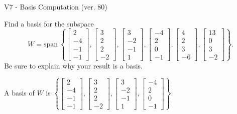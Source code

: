 \begin{exercise}
  \begin{exerciseTitle}V7 - Basis Computation (ver. 80)\end{exerciseTitle}
  \begin{exerciseStatement}
    Find a basis for the subspace 
\[W=\mathrm{span}\ \left\{\left[\begin{array}{r}
2 \\
-4 \\
-1 \\
-1
\end{array}\right] , \left[\begin{array}{r}
3 \\
2 \\
2 \\
-2
\end{array}\right] , \left[\begin{array}{r}
3 \\
-2 \\
-1 \\
1
\end{array}\right] , \left[\begin{array}{r}
-4 \\
2 \\
0 \\
-1
\end{array}\right] , \left[\begin{array}{r}
4 \\
2 \\
3 \\
-6
\end{array}\right] , \left[\begin{array}{r}
13 \\
0 \\
3 \\
-2
\end{array}\right]\right\}.\]
 Be sure to explain why your result is a basis.


  \end{exerciseStatement}
  \begin{exerciseAnswer}
   A basis of \(W\) is  \(\left\{\left[\begin{array}{r}
2 \\
-4 \\
-1 \\
-1
\end{array}\right] , \left[\begin{array}{r}
3 \\
2 \\
2 \\
-2
\end{array}\right] , \left[\begin{array}{r}
3 \\
-2 \\
-1 \\
1
\end{array}\right] , \left[\begin{array}{r}
-4 \\
2 \\
0 \\
-1
\end{array}\right]\right\}\).
  


  \end{exerciseAnswer}
\end{exercise}